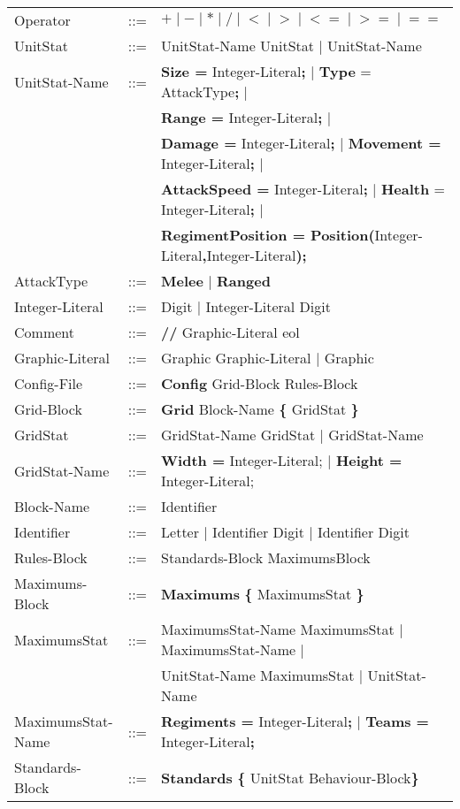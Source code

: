 \begin{center}
\begin{tabular}{ l l l }
				Operator 		   & 	::=	 & $\boldsymbol {+} \mid \boldsymbol {-} \mid  \boldsymbol {*}\mid 
											    \boldsymbol {/} \mid \boldsymbol {<} \mid  \boldsymbol {>} \mid
											    \boldsymbol {<=} \mid  \boldsymbol {>=} \mid \boldsymbol {==}$\\
				UnitStat		   &	::=  & UnitStat-Name UnitStat $\mid$ UnitStat-Name \\
				UnitStat-Name	   &	::=	 & {\bf Size =} Integer-Literal{\bf ;} $\mid$ {\bf Type} = AttackType{\bf ;} $\mid$ \\
								   &	     & {\bf  Range =} Integer-Literal{\bf;} $\mid$ \\
								   &	     & {\bf Damage =} Integer-Literal{\bf ;} $\mid$ {\bf Movement = }Integer-Literal{\bf ;} $\mid$ \\
								   &		 & {\bf AttackSpeed = }Integer-Literal{\bf ;} $\mid$ {\bf Health} = Integer-Literal{\bf ;} $\mid$ \\
								   &		 & {\bf RegimentPosition = Position(}Integer-Literal{\bf ,}Integer-Literal{\bf );} \\
				AttackType		   &    ::=  & {\bf Melee} $\mid$ {\bf Ranged} \\
				Integer-Literal    &	::=  & Digit $\mid$ Integer-Literal Digit \\
				Comment			   &	::=	 & {\bf //} Graphic-Literal eol \\
				Graphic-Literal	   &	::=	 & Graphic Graphic-Literal $\mid$ Graphic \\
				Config-File		   & 	::=  & {\bf Config} Grid-Block Rules-Block  		\\
				Grid-Block		   &	::=	 & {\bf Grid} Block-Name	 {\bf \{} GridStat \bf{\}} \\
				GridStat		   &	::=  & GridStat-Name GridStat $\mid$ GridStat-Name   \\
				GridStat-Name	   &	::=  & {\bf Width = } Integer-Literal; $\mid$ {\bf Height = } Integer-Literal; \\
				Block-Name		   &	::=  & Identifier							\\
				Identifier		   &    ::=  & Letter $\mid$ Identifier Digit $\mid$ Identifier Digit \\
				Rules-Block		   &	::=	 & Standards-Block MaximumsBlock 				\\
				Maximums-Block	   &	::=	 & {\bf Maximums} {\bf \{} MaximumsStat {\bf \}}	\\
				MaximumsStat	   &	::=  & MaximumsStat-Name MaximumsStat $\mid$ MaximumsStat-Name $\mid$		\\
								   &	     & UnitStat-Name MaximumsStat $\mid$ UnitStat-Name			\\
				MaximumsStat-Name  &	::=  & {\bf Regiments = } Integer-Literal{\bf ;} $\mid$ {\bf Teams = } Integer-Literal{\bf ;} \\
				Standards-Block	   &    ::=  & {\bf Standards} {\bf \{ } UnitStat Behaviour-Block\bf{\} }		\\
			\end{tabular}
		\end{center}
		
